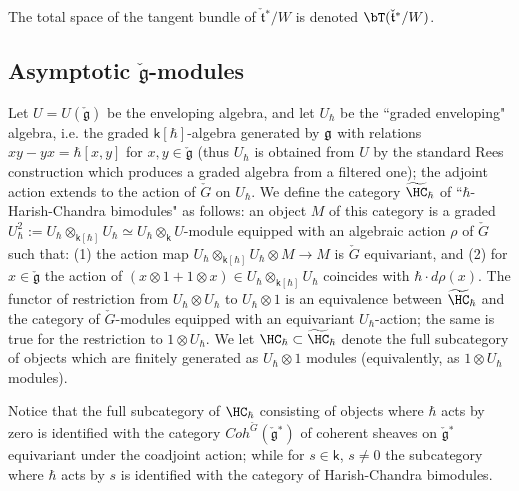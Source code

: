 \documentclass[11pt]{amsart}
\theoremstyle{definition}
\theoremstyle{remark}
\theoremstyle{remark}
\newtheorem{Rem}{Remark}
\newcommand{\<}{\langle}
\renewcommand{\>}{\rangle}
\newcommand{\g}{{\frak g}}
\newcommand{\Lg}{\check{\mathfrak g}{}}
\newcommand{\Lt}{\check{\mathfrak t}{}}
\newcommand{\LG}{{\check{G}}}
\newcommand{\HCh}{\HC_\hbar}
\newcommand{\kk}{\mathsf k}
\begin{document}
The total space of the tangent bundle of $\Lt^*/W$ is denoted $\bT(\Lt^*/W)$.


\subsection{Asymptotic $\Lg$-modules}
\label{agm}
Let $U=U(\Lg)$ be the enveloping algebra, and let  $U_\hbar$ be the
``graded enveloping" algebra, i.e. the graded $\kk[\hbar]$-algebra
generated by $\g$ with relations $xy-yx = \hbar [x,y]$ for $x,y
\in \Lg$ (thus $U_\hbar$ is obtained from $U$ by the standard Rees
construction which produces a graded algebra from a filtered one);
the adjoint action extends to the action of $\LG$ on $U_\hbar$. We
define the category $\widetilde \HCh$ of ``$\hbar$-Harish-Chandra
 bimodules" as follows: an object $M$ of this category is a 
graded $U_\hbar^2:=U_\hbar
 \otimes_{\kk[\hbar]} U_\hbar\simeq U_\hbar\otimes_\kk U$-module 
equipped with an algebraic
 action $\rho$ of $\LG$ such that: (1) the action map
 $U_\hbar\otimes_{\kk[\hbar]}U_\hbar \otimes M \to M$
 is $\LG$ equivariant, and (2) for $x\in \Lg$ the action of
 $(x\otimes 1 +1\otimes x)\in U_\hbar \otimes _{\kk[\hbar]} U_\hbar$
coincides with $\hbar \cdot d\rho(x)$. 
The functor of restriction
from $U_\hbar \otimes U_\hbar$ to $U_\hbar\otimes 1$ is an
equivalence between $\widetilde \HCh$ and the category of $\LG$-modules
equipped with an equivariant $U_\hbar$-action; the same is true
for the restriction to $1\otimes U_\hbar$. We let $\HCh \subset
\widetilde \HCh$ denote the full subcategory of objects which are
finitely generated as $U_\hbar\otimes 1$ modules (equivalently, as
$1\otimes U_\hbar$ modules).

Notice that the full
subcategory of $\HCh$ consisting of objects where $\hbar$ acts by
zero is identified with the category $Coh^\LG(\Lg^*)$ of coherent
sheaves on $\Lg^*$ equivariant under the coadjoint action; while
for $s\in \kk$, $s\ne 0$ the subcategory where $\hbar$ acts by $s$
is identified with the category of Harish-Chandra bimodules.

\end{document}
